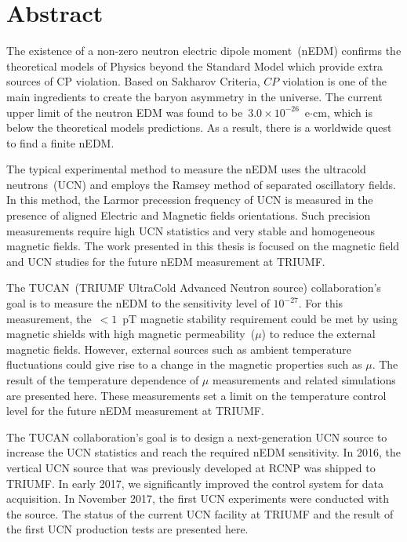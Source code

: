 \documentclass[12pt,a4paper]{book}
\begin{document}
\renewcommand{\thepage}{\roman{page}}
\chapter*{Abstract}
The existence of a non-zero neutron electric dipole moment~(nEDM)
confirms the theoretical models of Physics beyond the Standard Model
which provide extra sources of CP violation. Based on Sakharov
Criteria, $CP$ violation is one of the main ingredients to create the
baryon asymmetry in the universe. The current upper limit of the
neutron EDM was found to be~$3.0 \times 10^{-26}$~e$\cdot$cm, which is
below the theoretical models predictions. As a result, there is a
worldwide quest to find a finite nEDM.

The typical experimental method to measure the nEDM uses the ultracold
neutrons~(UCN) and employs the Ramsey method of separated oscillatory
fields. In this method, the Larmor precession frequency of UCN is
measured in the presence of aligned Electric and Magnetic fields
orientations. Such precision measurements require high UCN statistics
and very stable and homogeneous magnetic fields.  The work presented
in this thesis is focused on the magnetic field and UCN studies for
the future nEDM measurement at TRIUMF.

The TUCAN~(TRIUMF UltraCold Advanced Neutron source) collaboration's
goal is to measure the nEDM to the sensitivity level of
$10^{-27}$. For this measurement, the~$<1$~pT magnetic stability
requirement could be met by using magnetic shields with high magnetic
permeability~($\mu$) to reduce the external magnetic fields. However,
external sources such as ambient temperature fluctuations could give
rise to a change in the magnetic properties such as $\mu$. The result
of the temperature dependence of $\mu$ measurements and related
simulations are presented here.
These measurements set a limit on the temperature control level for
the future nEDM measurement at TRIUMF.

The TUCAN collaboration's goal is to design a next-generation UCN
source to increase the UCN statistics and reach the required nEDM
sensitivity. In 2016, the vertical UCN source that was previously
developed at RCNP was shipped to TRIUMF. In early 2017, we
significantly improved the control system for data acquisition. In
November 2017, the first UCN experiments were conducted with the
source. The status of the current UCN facility at TRIUMF and the
result of the first UCN production tests are presented here.
\end{document}
